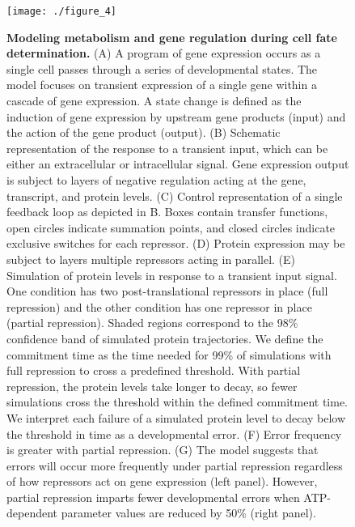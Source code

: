 \begin{figure}[h!]
\label{fig:metabolism:fig4}
\centering
\texttt{[image: ./figure\_4]}
\caption[Modeling metabolism and gene regulation during cell fate determination.]{\textbf{Modeling metabolism and gene regulation during cell fate determination.} (A) A program of gene expression occurs as a single cell passes through a series of developmental states. The model focuses on transient expression of a single gene within a cascade of gene expression. A state change is defined as the induction of gene expression by upstream gene products (input) and the action of the gene product (output). (B) Schematic representation of the response to a transient input, which can be either an extracellular or intracellular signal. Gene expression output is subject to layers of negative regulation acting at the gene, transcript, and protein levels. (C) Control representation of a single feedback loop as depicted in B. Boxes contain transfer functions, open circles indicate summation points, and closed circles indicate exclusive switches for each repressor. (D) Protein expression may be subject to layers multiple repressors acting in parallel. (E) Simulation of protein levels in response to a transient input signal. One condition has two post-translational repressors in place (full repression) and the other condition has one repressor in place (partial repression). Shaded regions correspond to the 98\% confidence band of simulated protein trajectories. We define the commitment time as the time needed for 99\% of simulations with full repression to cross a predefined threshold. With partial repression, the protein levels take longer to decay, so fewer simulations cross the threshold within the defined commitment time. We interpret each failure of a simulated protein level to decay below the threshold in time as a developmental error. (F) Error frequency is greater with partial repression. (G) The model suggests that errors will occur more frequently under partial repression regardless of how repressors act on gene expression (left panel). However, partial repression imparts fewer developmental errors when ATP-dependent parameter values are reduced by 50\% (right panel).}
\end{figure}

